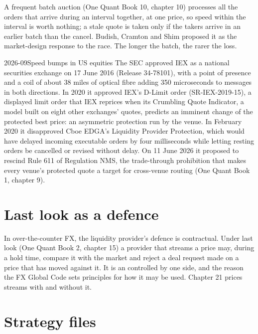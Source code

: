 A frequent batch auction (One Quant Book 10, chapter 10) processes all the orders that arrive during an interval together, at one price, so speed
within the interval is worth nothing; a stale quote is taken only if the takers arrive in an earlier batch than the cancel. Budish, Cramton and Shim
proposed it as the market-design response to the race. The longer the batch, the rarer the loss.

\begin{dated}{2026-09}{Speed bumps in US equities}\label{dat:hf:latency-arbitrage-and-its-defence:bumps}
The SEC approved IEX as a national securities exchange on 17 June 2016 (Release 34-78101), with a point of presence and a coil of about 38 miles of
optical fibre adding 350 microseconds to messages in both directions. In 2020 it approved IEX's D-Limit order (SR-IEX-2019-15), a displayed limit
order that IEX reprices when its Crumbling Quote Indicator, a model built on eight other exchanges' quotes, predicts an imminent change of the
protected best price: an asymmetric protection run by the venue. In February 2020 it disapproved Cboe EDGA's Liquidity Provider Protection, which
would have delayed incoming executable orders by four milliseconds while letting resting orders be cancelled or revised without delay. On 11 June
2026 it proposed to rescind Rule 611 of Regulation NMS, the trade-through prohibition that makes every venue's protected quote a target for
cross-venue routing (One Quant Book 1, chapter 9).
\end{dated}

\section{Last look as a defence}

In over-the-counter FX, the liquidity provider's defence is contractual. Under last look (One Quant Book 2, chapter 15) a provider that streams a price
may, during a hold time, compare it with the market and reject a deal request made on a price that has moved against it. It is an 
controlled by one side, and the reason the FX Global Code sets principles for how it may be used. Chapter 21 prices streams with and without it.

\section{Strategy files}

